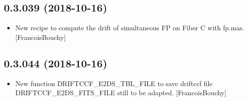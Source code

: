 \documentclass[a4paper,10pt,english]{report}
\begin{document}
\subsection{0.3.039 (2018-10-16)}
\label{\detokenize{misc/changelog:id291}}\begin{itemize}
\item {} 
New recipe to compute the drift of simultaneous FP on Fiber C with
fp.mas. {[}FrancoisBouchy{]}

\end{itemize}


\subsection{0.3.044 (2018-10-16)}
\label{\detokenize{misc/changelog:id292}}\begin{itemize}
\item {} 
New function DRIFTCCF\_E2DS\_TBL\_FILE to save driftccf file
DRIFTCCF\_E2DS\_FITS\_FILE still to be adapted. {[}FrancoisBouchy{]}

\end{itemize}
\end{document}
